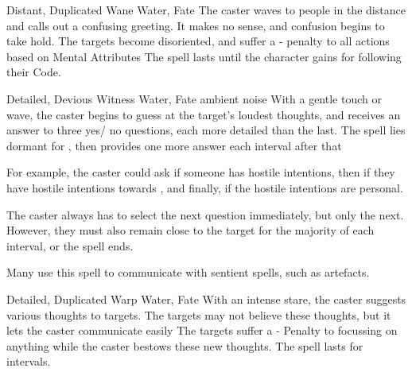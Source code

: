 \ifodd\value{diceNo}

  {Distant, Duplicated}%
  {Wane}%
  {Water, Fate}%
  {}%
  {
    The caster waves to people in the distance and calls out a confusing greeting.
    It makes no sense, and confusion begins to take hold.
    The targets become disoriented, and suffer a - penalty to all actions based on Mental Attributes}%
  {
    The spell lasts until the character gains  for following their Code.
  }

\else

  {Detailed, Devious}%
  {Witness}%
  {Water, Fate}%
  {ambient noise}%
  {With a gentle touch or wave, the caster begins to guess at the target's loudest thoughts, and receives an answer to three yes/ no questions, each more detailed than the last.
  The spell lies dormant for , then provides one more answer each interval after that}%
  {
  For example, the caster could ask if someone has hostile intentions, then if they have hostile intentions towards , and finally, if the hostile intentions are personal.

  The caster always has to select the next question immediately, but only the next.
  However, they must also remain close to the target for the majority of each \gls{interval}, or the spell ends.

  Many use this spell to communicate with sentient spells, such as \glspl{artefact}.}

  {Detailed, Duplicated}%
  {Warp}%
  {Water, Fate}%
  {}%
  {With an intense stare, the caster suggests various thoughts to  targets.
  The targets may not believe these thoughts, but it lets the caster communicate easily}%
  {The targets suffer a - Penalty to focussing on anything while the caster bestows these new thoughts.
  The spell lasts for  \glspl{interval}.}

\fi
{}
